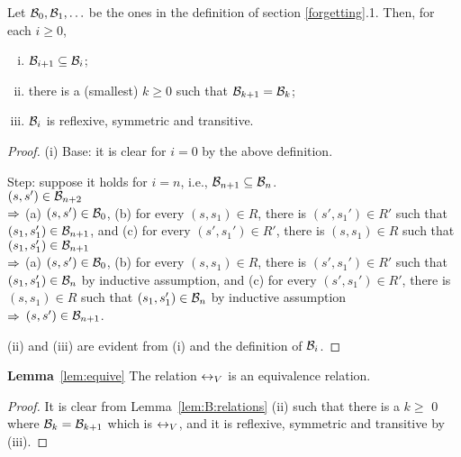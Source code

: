 \documentclass{article}
\begin{document}
  \noindent\begin{lemma}\label{lem:B:relations}
   Let  ${\cal B}_0, {\cal B}_1,\ldots$ be the ones in the definition of section \ref{forgetting}.1.
   Then,  for each $i\ge 0$,
   \begin{enumerate}[(i)]
      \item ${\cal B}_{i+1}\subseteq {\cal B}_i$;
      \item there is a (smallest) $k\ge 0$ such that ${\cal B}_{k+1}={\cal B}_k$;
      \item ${\cal B}_i$ is reflexive, symmetric and transitive.
   \end{enumerate}
 \end{lemma}
 \begin{proof}
   (i)
   Base: it is clear for $i=0$ by the above definition.

   Step: suppose it holds for $i=n$, i.e., ${\cal B}_{n+1}\subseteq{\cal B}_n$. \\
   $(s,s')\in{\cal B}_{n+2}$\\
   $\Rightarrow$ (a) $(s,s')\in  {\cal B}_0$,
     (b) for every $(s,s_1)\in R$, there is $(s',s_1')\in R'$
      such that $(s_1,s_1')\in {\cal B}_{n+1}$, and
     (c)  for every $(s',s_1')\in R'$, there is $(s,s_1)\in R$
     such that $(s_1,s_1')\in {\cal B}_{n+1}$\\
   $\Rightarrow$ (a) $(s,s')\in  {\cal B}_0$,
   (b) for every $(s,s_1)\in R$, there is $(s',s_1')\in R'$
      such that $(s_1,s_1')\in {\cal B}_{n}$ by inductive assumption, and
   (c)  for every $(s',s_1')\in R'$, there is $(s,s_1)\in R$
     such that $(s_1,s_1')\in {\cal B}_{n}$ by inductive assumption\\
   $\Rightarrow$ $(s,s')\in {\cal B}_{n+1}$.

   (ii) and (iii) are evident from (i) and the definition of ${\cal B}_i$.
 \end{proof}


 \noindent\textbf{Lemma}~\ref{lem:equive}  The relation $\leftrightarrow_V$ is an equivalence relation.
 \begin{proof}
 It is clear from Lemma~\ref{lem:B:relations} (ii) such that there is a $k \geq $ 0 where ${\cal B}_k = {\cal B}_{k+1}$ which is  $\leftrightarrow_V$, and it is reflexive, symmetric and transitive by (iii).
 \end{proof}
\end{document}
